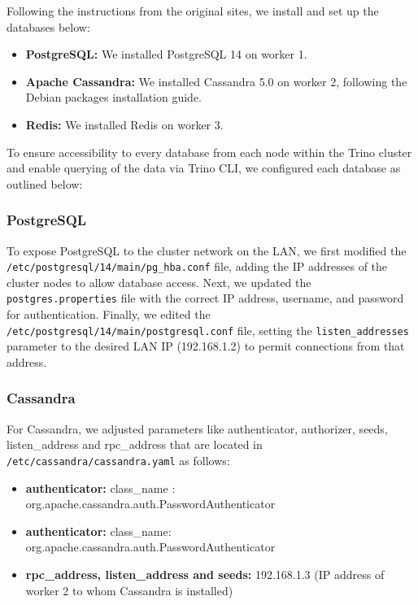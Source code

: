 \documentclass[conference]{IEEEtran}
\begin{document}
Following the instructions from the original sites, we install and set up the databases below:

\begin{itemize}
	\item \textbf{PostgreSQL:} We installed PostgreSQL 14 on worker 1.
	\item \textbf{Apache Cassandra:} We installed Cassandra 5.0 on worker 2, following the Debian packages installation guide.
	\item \textbf{Redis:} We installed Redis on worker 3.
\end{itemize}


To ensure accessibility to every database from each node within the Trino cluster and enable querying of the data via Trino CLI, we configured each database as outlined below:

\subsubsection{PostgreSQL}

To expose PostgreSQL to the cluster network on the LAN, we first modified the \texttt{/etc/postgresql/14/main/pg\_hba.conf} file,
adding the IP addresses of the cluster nodes to allow database access. Next, we updated the \texttt{postgres.properties} file with the
correct IP address, username, and password for authentication. Finally, we edited the \texttt{/etc/postgresql/14/main/postgresql.conf}
file, setting the \texttt{listen\_addresses} parameter to the desired LAN IP (192.168.1.2) to permit connections from that address.
\subsubsection{Cassandra}

For Cassandra, we adjusted parameters like authenticator, authorizer, seeds, listen\_address and rpc\_address that are located in \texttt{/etc/cassandra/cassandra.yaml} as follows:

\begin{itemize}
	\item \textbf{authenticator:} class\_name : \\org.apache.cassandra.auth.PasswordAuthenticator
	\item \textbf{authenticator:}
	      class\_name: \\org.apache.cassandra.auth.PasswordAuthenticator
	\item \textbf{rpc\_address, listen\_address and seeds:} 192.168.1.3 (IP address of worker 2 to whom Cassandra is installed)
\end{itemize}
\end{document}
